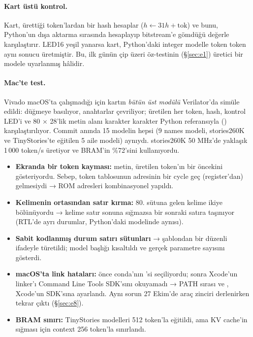 \paragraph{Kart üstü kontrol.} Kart, ürettiği token'lardan bir hash hesaplar ($h \leftarrow 31h + \text{tok}$) ve bunu, Python'un dışa aktarma sırasında hesaplayıp bitstream'e gömdüğü değerle karşılaştırır. LED16 yeşil yanarsa kart, Python'daki integer modelle token token aynı sonucu üretmiştir. Bu, ilk günün çip üzeri öz-testinin (§\ref{sec:e1}) üretici bir modele uyarlanmış hâlidir.

\paragraph{Mac'te test.} Vivado macOS'ta çalışmadığı için kartın \emph{bütün üst modülü} Verilator'da simüle edildi: düğmeye basılıyor, anahtarlar çevriliyor; üretilen her token, hash, kontrol LED'i ve 80 × 28'lik metin alanı karakter karakter Python referansıyla () karşılaştırılıyor. Commit anında 15 modelin hepsi (9 names modeli, stories260K ve TinyStories'te eğitilen 5 aile modeli) aynıydı. stories260K 50 MHz'de yaklaşık 1\,000 token/s üretiyor ve BRAM'in \%72'sini kullanıyordu.

\sorunlar
\begin{itemize}
  \item \textbf{Ekranda bir token kayması:} metin, üretilen token'ın bir öncekini gösteriyordu. Sebep, token tablosunun adresinin bir cycle geç (register'dan) gelmesiydi → ROM adresleri kombinasyonel yapıldı.
  \item \textbf{Kelimenin ortasından satır kırma:} 80. sütuna gelen kelime ikiye bölünüyordu → kelime satır sonuna sığmazsa bir sonraki satıra taşınıyor (RTL'de ayrı durumlar, Python'daki  modelinde aynısı).
  \item \textbf{Sabit kodlanmış durum satırı sütunları} → şablondan bir düzenli ifadeyle türetildi; model başlığı kısaltıldı ve gerçek parametre sayısını gösterdi.
  \item \textbf{macOS'ta link hataları:} önce conda'nın 'si seçiliyordu; sonra Xcode'un linker'ı Command Line Tools SDK'sını okuyamadı → PATH sırası ve , Xcode'un SDK'sına ayarlandı. Aynı sorun 27 Ekim'de araç zinciri derlenirken tekrar çıktı (§\ref{sec:e8}).
  \item \textbf{BRAM sınırı:} TinyStories modelleri 512 token'la eğitildi, ama KV cache'in sığması için context 256 token'la sınırlandı.
\end{itemize}

